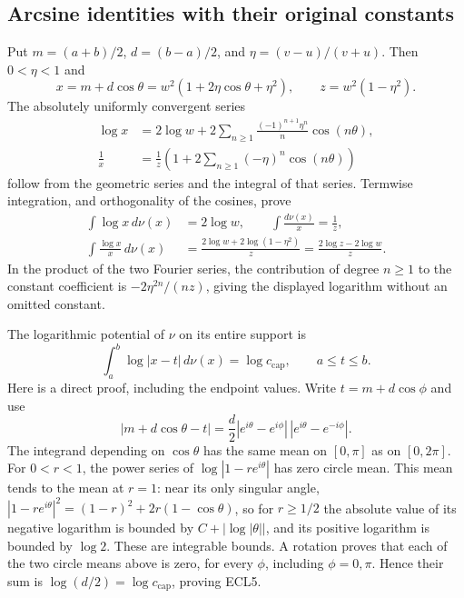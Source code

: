\documentclass[11pt,a4paper]{article}
\begin{document}
\subsection{Arcsine identities with their original constants}

Put $m=(a+b)/2$, $d=(b-a)/2$, and $\eta=(v-u)/(v+u)$.
Then $0<\eta<1$ and
\[
x=m+d\cos\theta
 =w^2(1+2\eta\cos\theta+\eta^2),\qquad
z=w^2(1-\eta^2).
\]
The absolutely uniformly convergent series
\[
\begin{split}
\log x&=2\log w+
  2\sum_{n\geq1}\frac{(-1)^{n+1}\eta^n}{n}\cos(n\theta),\\
\frac1x&=\frac1z\left(1+
  2\sum_{n\geq1}(-\eta)^n\cos(n\theta)\right)
\end{split}
\]
follow from the geometric series and the integral of that series.
Termwise integration, and orthogonality of the cosines, prove
\begin{equation}\tag{ECL4}
\begin{split}
\int\log x\,d\nu(x)&=2\log w,\qquad
\int\frac{d\nu(x)}x=\frac1z,\\
\int\frac{\log x}{x}\,d\nu(x)
 &=\frac{2\log w+2\log(1-\eta^2)}z
 =\frac{2\log z-2\log w}z.
\end{split}
\end{equation}
In the product of the two Fourier series, the contribution of degree
$n\geq1$ to the constant coefficient is
$-2\eta^{2n}/(nz)$, giving the displayed logarithm without an omitted
constant.

The logarithmic potential of $\nu$ on its entire support is
\begin{equation}\tag{ECL5}
\int_a^b\log|x-t|\,d\nu(x)=\log c_{\mathrm{cap}},
\qquad a\leq t\leq b.
\end{equation}
Here is a direct proof, including the endpoint values. Write
$t=m+d\cos\phi$ and use
\[
|m+d\cos\theta-t|
=\frac d2
 |e^{i\theta}-e^{i\phi}|\,
 |e^{i\theta}-e^{-i\phi}|.
\]
The integrand depending on $\cos\theta$ has the same mean on
$[0,\pi]$ as on $[0,2\pi]$. For $0<r<1$, the power series of
$\log|1-re^{i\theta}|$ has zero circle mean. This mean tends to
the mean at $r=1$: near its only singular angle,
$|1-re^{i\theta}|^2=(1-r)^2+2r(1-\cos\theta)$,
so for $r\geq1/2$ the absolute value of its negative logarithm
is bounded by $C+|\log|\theta||$, and its positive logarithm
is bounded by $\log2$. These are integrable bounds. A rotation
proves that each of the two circle means above is zero, for
every $\phi$, including $\phi=0,\pi$. Hence their sum is
$\log(d/2)=\log c_{\mathrm{cap}}$, proving ECL5.
\end{document}

